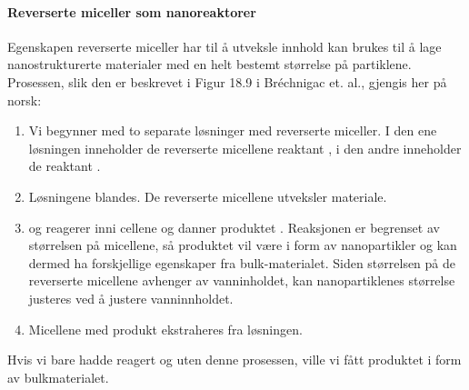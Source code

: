 \paragraph{Reverserte miceller som nanoreaktorer} Egenskapen reverserte miceller har til å utveksle innhold kan brukes til å lage nanostrukturerte materialer med en helt bestemt størrelse på partiklene. Prosessen, slik den er beskrevet i Figur 18.9 i Bréchnigac et. al., gjengis her på norsk:
\begin{enumerate}
	\item Vi begynner med to separate løsninger med reverserte miceller. I den ene løsningen inneholder de reverserte micellene reaktant , i den andre inneholder de reaktant .
	\item Løsningene blandes. De reverserte micellene utveksler materiale.
	\item {} og  reagerer inni cellene og danner produktet . Reaksjonen er begrenset av størrelsen på micellene, så produktet vil være i form av nanopartikler og kan dermed ha forskjellige egenskaper fra bulk-materialet. Siden størrelsen på de reverserte micellene avhenger av vanninholdet, kan nanopartiklenes størrelse justeres ved å justere vanninnholdet.
	\item Micellene med produkt ekstraheres fra løsningen.
\end{enumerate}
Hvis vi bare hadde reagert  og  uten denne prosessen, ville vi fått produktet i form av bulkmaterialet. 
